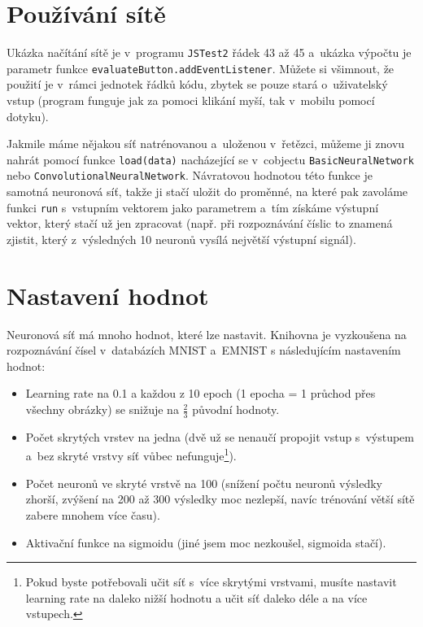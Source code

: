 \documentclass[12pt]{report}			%
\begin{document}
			\section{Používání sítě}
				Ukázka načítání sítě je v~programu \verb!JSTest2! řádek 43 až 45 a~ukázka výpočtu je parametr funkce \verb!evaluateButton.addEventListener!. Můžete si všimnout, že použití je v~rámci jednotek řádků kódu, zbytek se pouze stará o~uživatelský vstup (program funguje jak za pomoci klikání myší, tak v~mobilu pomocí dotyku).
				
				Jakmile máme nějakou síť natrénovanou a~uloženou v~řetězci, můžeme ji znovu nahrát pomocí funkce \verb!load(data)! nacházející se v~\gls{cobject}u  \verb!BasicNeuralNetwork! nebo \verb!ConvolutionalNeuralNetwork!. Návratovou hodnotou této funkce je samotná neuronová síť, takže ji stačí uložit do proměnné, na které pak zavoláme funkci \verb!run! s~vstupním vektorem jako parametrem a~tím získáme výstupní vektor, který stačí už jen zpracovat (např. při rozpoznávání číslic to znamená zjistit, který z~výsledných 10 neuronů vysílá největší výstupní signál).
				
		
			\section{Nastavení hodnot}
				Neuronová síť má mnoho hodnot, které lze nastavit. Knihovna je vyzkoušena na rozpoznávání čísel v~databázích MNIST a~EMNIST s následujícím nastavením hodnot:
				\begin{itemize}
					\item Learning rate na 0.1 a každou z 10 epoch (1 epocha = 1 průchod přes všechny obrázky) se snižuje na $\frac{2}{3}$ původní hodnoty.
					\item Počet skrytých vrstev na jedna (dvě už se nenaučí propojit vstup s~výstupem a~bez skryté vrstvy síť vůbec nefunguje\footnote{Pokud byste potřebovali učit síť s~více skrytými vrstvami, musíte nastavit learning rate na daleko nižší hodnotu a učit síť daleko déle a na více vstupech.}).
					\item Počet neuronů ve skryté vrstvě na 100 (snížení počtu neuronů výsledky zhorší, zvýšení na 200 až 300 výsledky moc nezlepší, navíc trénování větší sítě zabere mnohem více času).
					\item Aktivační funkce na sigmoidu (jiné jsem moc nezkoušel, sigmoida stačí).
				\end{itemize}


	\appendix
	
\end{document}
